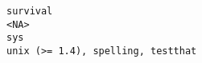 \documentclass[
  letterpaper,
  DIV=11,
  numbers=noendperiod]{scrreprt}
\begin{document}
\begin{verbatim}
survival                                                                                                                                                                                                                                                                                                                                                                                                                                                                                                                                                                                                                                                                                                                                                                                                                                                                                                                                                                                                                                                                                                                                                                                                                                                                                                 <NA>
sys                                                                                                                                                                                                                                                                                                                                                                                                                                                                                                                                                                                                                                                                                                                                                                                                                                                                                                                                                                                                                                                                                                                                                                                                                                                                         unix (>= 1.4), spelling, testthat

\end{verbatim}
\end{document}
